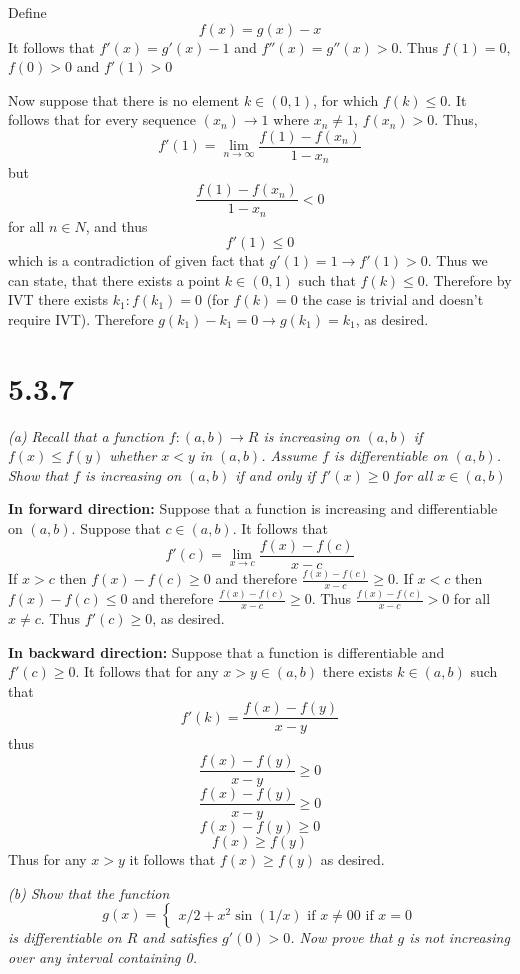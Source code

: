 \documentclass[11pt,oneside,titlepage]{book}
\begin{document}
Define
$$f(x) = g(x) - x$$
It follows that $f'(x) = g'(x) - 1$ and $f''(x) = g''(x) > 0$. Thus
$f(1) = 0$, $f(0) > 0$ and $f'(1) > 0$

Now suppose that there is no element $k \in (0, 1)$, for which
$f(k) \leq 0$. It follows that for every sequence $(x_n) \to 1$ where
$x_n \neq 1$, $f(x_n) > 0$. Thus,
$$f'(1) = \lim_{n \to \infty}\frac{f(1) - f(x_n)}{1 - x_n}$$
but
$$\frac{f(1) - f(x_n)}{1 - x_n} < 0$$
for all $n \in N$, and thus
$$f'(1) \leq 0$$
which is a contradiction of given fact that $g'(1) = 1 \to f'(1) > 0$. Thus
we can state, that there exists a point $k \in (0, 1)$ such that
$f(k) \leq 0$. Therefore by IVT there exists $k_1: f(k_1) = 0$
(for  $f(k) = 0$ the case is trivial and doesn't require IVT).
Therefore $g(k_1) - k_1 = 0 \to g(k_1) = k_1$, as desired.

\section*{5.3.7}
\textit{(a) Recall that a function $f: (a, b) \to R$ is increasing on $(a, b)$
  if $f(x) \leq f(y)$ whether $x < y$ in $(a, b)$. Assume $f$ is differentiable
  on $(a, b)$. Show that $f$ is increasing on $(a, b)$ if and only if
  $f'(x) \geq 0$ for all $x \in (a, b)$}

\textbf{In forward direction: }
Suppose that a function is increasing and differentiable on  $(a, b)$.
Suppose that $c \in (a, b)$. It follows that
$$f'(c) = \lim_{x \to c}\frac{f(x) - f(c)}{x - c}$$
If $x > c$ then $f(x) - f(c) \geq 0$ and therefore
$\frac{f(x) - f(c)}{x - c} \geq 0$.
If $x < c$ then $f(x) - f(c) \leq 0$ and therefore
$\frac{f(x) - f(c)}{x - c} \geq 0$.
Thus $\frac{f(x) - f(c)}{x - c} > 0$ for all $x \neq c$. Thus
$f'(c) \geq 0$, as desired.

\textbf{In backward direction: }
Suppose that a function is differentiable and $f'(c) \geq 0$. It follows that
for any $x >  y \in (a, b)$ there exists $k \in (a, b)$ such that
$$f'(k) = \frac{f(x) - f(y)}{x - y}$$
thus
$$\frac{f(x) - f(y)}{x - y} \geq 0$$
$$\frac{f(x) - f(y)}{x - y} \geq 0$$
$$f(x) - f(y) \geq 0$$
$$f(x) \geq f(y)$$
Thus for any $x > y$ it follows that $f(x) \geq f(y)$ as desired.

\textit{(b) Show that the function}
\begin{equation}
  g(x) = 
  \begin{cases}
    x / 2 + x^2 \sin(1/x) \text{ if } x \neq 0
    0 \text{ if } x = 0
  \end{cases}
\end{equation}
\textit{is differentiable on $R$ and satisfies $g'(0) > 0$. Now
  prove that $g$ is not increasing over any interval containing 0.}
\end{document}
